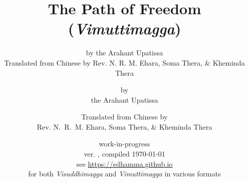 

\def\thepageIssue{\href{https://github.com/edhamma/vism/issues/new?title=Vimuttimagga\%20issue\%20at\%20page\%20\thepage\&body=(\vismCommitTimestampQuery)}{\thepage}}
\def\vismAssertFootnoteCounter#1{\relax}
\usepackage[stable]{footmisc}



	\title{The Path of Freedom \\ (\emph{Vimuttimagga})}
	\date{work-in-progress \\ ver. \vismCommitHref, compiled \today \\ see \url{https://edhamma.github.io} \\ for both \emph{Visuddhimagga} and \emph{Vimuttimagga} in various formats}
	\ifplastex
		\author{by the Arahant Upatissa \\ Translated from Chinese by Rev. N. R. M. Ehara, Soma Thera, \& Kheminda Thera}
	\else
		\author{by \\ the Arahant Upatissa \and Translated from Chinese by \\ Rev. N.~R.~M. Ehara, Soma Thera, \& Kheminda Thera}
	\fi
	\maketitle

	\frontmatter
		\bgroup
			\ifplastex\else\renewcommand{\baselinestretch}{0.2}\normalsize\fi
			\tableofcontents
		\egroup
		

